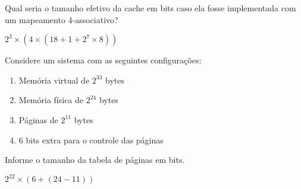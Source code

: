 \documentclass{article}
\begin{document}
Qual seria o tamanho efetivo da cache em bits caso ela fosse implementada com
um mapeamento 4-associativo?

$2^{3}\times(4\times(18+1+2^{7}\times8))$

Considere um sistema com as seguintes configurações:

\begin{enumerate}
\item Memória virtual de $2^33$ bytes
\item Memória física de $2^24$ bytes
\item Páginas de $2^11$ bytes
\item 6 bits extra para o controle das páginas
\end{enumerate}

Informe o tamanho da tabela de páginas em bits.

$2^{22}\times(6+(24-11))$
\end{document}
